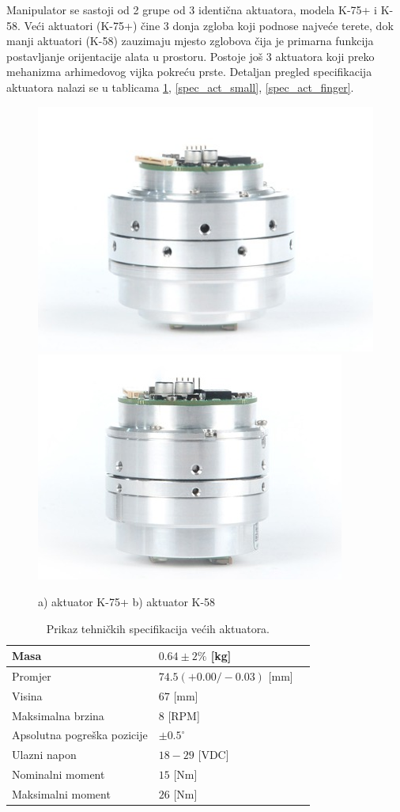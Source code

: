 \documentclass[times, utf8, diplomski, numeric]{fer}
\begin{document}
Manipulator se sastoji od 2 grupe od 3 identična aktuatora, modela K-75+ i K-58.
Veći aktuatori (K-75+) čine 3 donja zgloba koji podnose najveće terete, dok manji aktuatori (K-58) zauzimaju mjesto zglobova čija je primarna funkcija postavljanje orijentacije alata u prostoru.
Postoje još 3 aktuatora koji preko mehanizma arhimedovog vijka pokreću prste. 
Detaljan pregled specifikacija aktuatora nalazi se u tablicama \ref{spec_act_big}, \ref{spec_act_small}, \ref{spec_act_finger}.

\begin{figure}[h!]
\includegraphics[scale=0.5]{k75plus}
\includegraphics[scale=0.5]{k58}
\caption{a) aktuator K-75+ b) aktuator K-58}
\end{figure}

\begin{table}[h!]
    \centering
    \begin{tabular}{ | l | l | l |}
    \hline
    Masa & $0.64 \pm 2\%$ [kg] \\ \hline
    Promjer  & $74.5(+0.00/-0.03)$ [mm] \\ \hline
    Visina & $67$ [mm] \\ \hline
    Maksimalna brzina & $8$ [RPM] \\ \hline
    Apsolutna pogreška pozicije & $\pm0.5^{\circ}$ \\ \hline
    Ulazni napon  & $18 - 29$ [VDC] \\ \hline
    Nominalni moment & $15$ [Nm] \\ \hline
    Maksimalni moment & $26$  [Nm]  \\ \hline
    \end{tabular}
    \caption{Prikaz tehničkih specifikacija većih aktuatora.} \label{spec_act_big}
\end{table}
\end{document}
